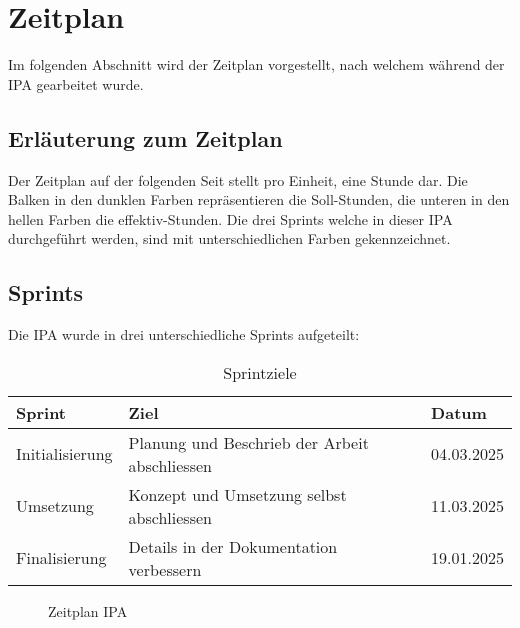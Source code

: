 \chapter{Zeitplan}
Im folgenden Abschnitt wird der Zeitplan vorgestellt, nach welchem während der IPA 
gearbeitet wurde.

\section{Erläuterung zum Zeitplan}
Der Zeitplan auf der folgenden Seit stellt pro Einheit, eine Stunde dar. Die Balken in den
dunklen Farben repräsentieren die Soll-Stunden, die unteren in den hellen Farben die effektiv-Stunden.
Die drei Sprints welche in dieser IPA durchgeführt werden, sind mit unterschiedlichen Farben gekennzeichnet.

\section{Sprints}
Die IPA wurde in drei unterschiedliche Sprints aufgeteilt: 

\begin{table}[h!]
  \begin{tabular}{|L{0.3\textwidth}|L{0.4\textwidth}|L{0.3\textwidth}|}
      \hline
       \color{white}\textbf{Sprint} & \color{white}\textbf{Ziel} & \color{white}\textbf{Datum} \\[12pt]
      \hline
      Initialisierung & Planung und Beschrieb der Arbeit abschliessen & 04.03.2025 \\
     \hline
     Umsetzung & Konzept und Umsetzung selbst abschliessen & 11.03.2025 \\
     \hline
     Finalisierung & Details in der Dokumentation verbessern & 19.01.2025 \\
     \hline
    \end{tabular}
    \caption{Sprintziele}
\end{table}

\newpage

\storeareas\zeitplan
{}
\areaset
  {\dimexpr\the\paperwidth-1cm\relax}%
  {\dimexpr\the\paperheight-5.5cm\relax}%
\recalctypearea

\begin{figure}[htp] 
  \caption{Zeitplan IPA}
\end{figure}

\restoregeometry
\zeitplan
\newpage

